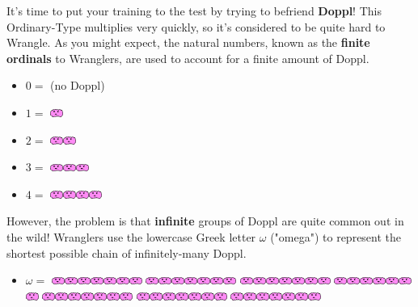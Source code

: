 

\newcommand{\mappDoppl}{\includegraphics[height=0.1in]{assets/doppl.pdf}}
\newcommand{\mappDopplOmega}{\includegraphics[height=0.1in]{assets/doppl-omega.pdf}}
\newcommand{\mappDopplOmegaSquared}{\includegraphics[height=0.1in]{assets/doppl-omega2.pdf}}

It's time to put your training to the test by trying to befriend \textbf{Doppl}!
This Ordinary-Type \mappMobimon{} multiplies very quickly, so it's
considered to be quite hard to Wrangle. As you might expect, the natural
numbers, known as the \textbf{finite ordinals} to \mappMobimon{} Wranglers,
are used to account for a finite amount of Doppl.

\begin{itemize}
\item \(0=\) (no Doppl)

\item \(1=\) \mappDoppl

\item \(2=\) \mappDoppl\mappDoppl

\item \(3=\) \mappDoppl\mappDoppl\mappDoppl

\item \(4=\) \mappDoppl\mappDoppl\mappDoppl\mappDoppl
\end{itemize}

However, the problem is that \textbf{infinite} groups of Doppl are quite
common out in the wild! Wranglers use the lowercase Greek letter \(\omega\)
("omega") to represent the shortest possible chain of infinitely-many Doppl.

\begin{itemize}
  \item \(\omega=\)
  \mappDoppl\mappDoppl\mappDoppl\mappDoppl\mappDoppl\mappDoppl\mappDoppl
  \mappDoppl\mappDoppl\mappDoppl\mappDoppl\mappDoppl\mappDoppl\mappDoppl
  \mappDoppl\mappDoppl\mappDoppl\mappDoppl\mappDoppl\mappDoppl\mappDoppl
  \mappDoppl\mappDoppl\mappDoppl\mappDoppl\mappDoppl\mappDoppl\mappDoppl
  \mappDoppl\mappDoppl\mappDoppl\mappDoppl\mappDoppl\mappDoppl\mappDoppl
  \mappDoppl\mappDoppl\mappDoppl\mappDoppl\mappDoppl\mappDoppl\mappDoppl
  \mappDoppl\mappDoppl\mappDoppl\mappDoppl\mappDoppl\mappDoppl\mappDoppl
\end{itemize}

